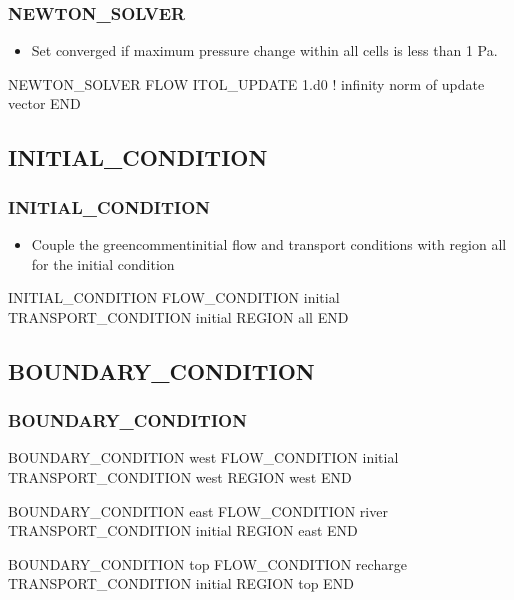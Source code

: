 \documentclass{beamer}
\newcommand\bluecomment[1]{{{\color{blue} #1}}}
\newcommand\greencomment[1]{{{\color{green} #1}}}
\begin{document}
\begin{frame}[fragile]\frametitle{\bf NEWTON\_SOLVER}

\begin{itemize}
  \item Set converged if maximum pressure change within all cells is less than 1 Pa.
\end{itemize}

\begin{semiverbatim}

NEWTON_SOLVER FLOW
ITOL_UPDATE 1.d0   \bluecomment{! infinity norm of update vector}
END
\end{semiverbatim}

\end{frame}

\subsection{INITIAL\_CONDITION}

\begin{frame}[fragile]\frametitle{\bf INITIAL\_CONDITION}

\begin{itemize}
\item Couple the greencomment{initial} flow and transport conditions with region \greencomment{all} for the initial condition
\end{itemize}

\begin{semiverbatim}

INITIAL_CONDITION
  FLOW_CONDITION initial
  TRANSPORT_CONDITION initial
  REGION all
END

\end{semiverbatim}

\end{frame}

\subsection{BOUNDARY\_CONDITION}

\begin{frame}\frametitle{BOUNDARY\_CONDITION}

\small
\begin{semiverbatim}
BOUNDARY_CONDITION west
  FLOW_CONDITION initial
  TRANSPORT_CONDITION west
  REGION west
END

BOUNDARY_CONDITION east
  FLOW_CONDITION river
  TRANSPORT_CONDITION initial
  REGION east
END

BOUNDARY_CONDITION top
  FLOW_CONDITION recharge
  TRANSPORT_CONDITION initial
  REGION top
END
\end{semiverbatim}

\end{frame}
\end{document}
